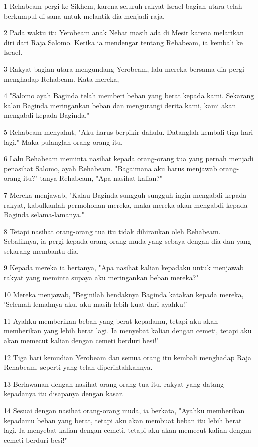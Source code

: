 \par 1 Rehabeam pergi ke Sikhem, karena seluruh rakyat Israel bagian utara telah berkumpul di sana untuk melantik dia menjadi raja.
\par 2 Pada waktu itu Yerobeam anak Nebat masih ada di Mesir karena melarikan diri dari Raja Salomo. Ketika ia mendengar tentang Rehabeam, ia kembali ke Israel.
\par 3 Rakyat bagian utara mengundang Yerobeam, lalu mereka bersama dia pergi menghadap Rehabeam. Kata mereka,
\par 4 "Salomo ayah Baginda telah memberi beban yang berat kepada kami. Sekarang kalau Baginda meringankan beban dan mengurangi derita kami, kami akan mengabdi kepada Baginda."
\par 5 Rehabeam menyahut, "Aku harus berpikir dahulu. Datanglah kembali tiga hari lagi." Maka pulanglah orang-orang itu.
\par 6 Lalu Rehabeam meminta nasihat kepada orang-orang tua yang pernah menjadi penasihat Salomo, ayah Rehabeam. "Bagaimana aku harus menjawab orang-orang itu?" tanya Rehabeam, "Apa nasihat kalian?"
\par 7 Mereka menjawab, "Kalau Baginda sungguh-sungguh ingin mengabdi kepada rakyat, kabulkanlah permohonan mereka, maka mereka akan mengabdi kepada Baginda selama-lamanya."
\par 8 Tetapi nasihat orang-orang tua itu tidak dihiraukan oleh Rehabeam. Sebaliknya, ia pergi kepada orang-orang muda yang sebaya dengan dia dan yang sekarang membantu dia.
\par 9 Kepada mereka ia bertanya, "Apa nasihat kalian kepadaku untuk menjawab rakyat yang meminta supaya aku meringankan beban mereka?"
\par 10 Mereka menjawab, "Beginilah hendaknya Baginda katakan kepada mereka, 'Selemah-lemahnya aku, aku masih lebih kuat dari ayahku!'
\par 11 Ayahku memberikan beban yang berat kepadamu, tetapi aku akan memberikan yang lebih berat lagi. Ia menyebat kalian dengan cemeti, tetapi aku akan memecut kalian dengan cemeti berduri besi!"
\par 12 Tiga hari kemudian Yerobeam dan semua orang itu kembali menghadap Raja Rehabeam, seperti yang telah diperintahkannya.
\par 13 Berlawanan dengan nasihat orang-orang tua itu, rakyat yang datang kepadanya itu disapanya dengan kasar.
\par 14 Sesuai dengan nasihat orang-orang muda, ia berkata, "Ayahku memberikan kepadamu beban yang berat, tetapi aku akan membuat beban itu lebih berat lagi. Ia menyebat kalian dengan cemeti, tetapi aku akan memecut kalian dengan cemeti berduri besi!"
